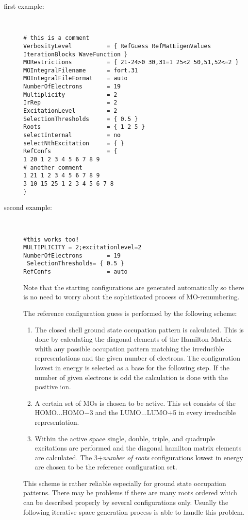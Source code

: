 \begin{description}
\item[first example:]
\ 

\begin{footnotesize}
\begin{verbatim}
# this is a comment
VerbosityLevel          = { RefGuess RefMatEigenValues IterationBlocks WaveFunction }
MORestrictions          = { 21-24>0 30,31=1 25<2 50,51,52<=2 }
MOIntegralFilename      = fort.31
MOIntegralFileFormat    = auto
NumberOfElectrons       = 19
Multiplicity            = 2
IrRep                   = 2
ExcitationLevel         = 2
SelectionThresholds     = { 0.5 }
Roots                   = { 1 2 5 }
selectInternal          = no
selectNthExcitation     = { }
RefConfs                = {
1 20 1 2 3 4 5 6 7 8 9
# another comment
1 21 1 2 3 4 5 6 7 8 9
3 10 15 25 1 2 3 4 5 6 7 8
}
\end{verbatim}
\end{footnotesize}

\item[second example:]
\ 

\begin{footnotesize}
\begin{verbatim}
#this works too!
MULTIPLICITY = 2;excitationlevel=2
NumberOfElectrons       = 19
 SelectionThresholds= { 0.5 }
RefConfs                = auto
\end{verbatim}
\end{footnotesize}
Note that the starting configurations are generated automatically so there
is no need to worry about the sophisticated process of MO-renumbering.

The reference configuration guess is performed by the following scheme:
\begin{enumerate}
\item The closed shell ground state occupation pattern is calculated.
This is done by calculating the diagonal elements of the Hamilton Matrix
whith any possible occupation pattern matching the irreducible representations
and the given number of electrons. The configuration lowest in energy is
selected as a base for the following step. If the number of given electrons is
odd the calculation is done with the positive ion.
\item A certain set of MOs is chosen to be active. This set consists of
the HOMO$\ldots$HOMO$-$3 and the LUMO$\ldots$LUMO$+$5 in every irreducible
representation.
\item Within the active space single, double, triple, and quadruple
excitations are performed and the diagonal hamilton matrix elements are
calculated. The 3+{\it number of roots} configurations lowest in energy
are chosen to be the reference configuration set.
\end{enumerate}

This scheme is rather reliable especially for ground state occupation patterns.
There may be problems if there are many roots ordered which can be described
properly by several configurations only. Usually the following
iterative space generation process is able to handle this problem.

\end{description}
